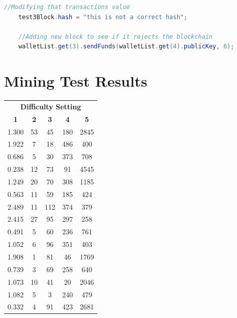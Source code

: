 \documentclass{l4proj}
\begin{document}
\begin{appendices}
\begin{lstlisting}[language=java, float=h
    , label=lst:testCode]
    //Modifying that transactions value
    test3Block.hash = "this is not a correct hash";

    //Adding new block to see if it rejects the blockchain
    walletList.get(3).sendFunds(walletList.get(4).publicKey, 6);
\end{lstlisting}

\section{Mining Test Results}
\begin{table}[!ht]
    \centering
    \begin{tabular}{ccccc}
    \hline
    \multicolumn{5}{c}{\textbf{Difficulty Setting}}                \\
    \textbf{1} & \textbf{2} & \textbf{3} & \textbf{4} & \textbf{5} \\ \hline
    1.300      & 53         & 45         & 180        & 2845       \\
    1.922      & 7          & 18         & 486        & 400        \\
    0.686      & 5          & 30         & 373        & 708        \\
    0.238      & 12         & 73         & 91         & 4545       \\
    1.249      & 20         & 70         & 308        & 1185       \\
    0.563      & 11         & 59         & 185        & 424        \\
    2.489      & 11         & 112        & 374        & 379        \\
    2.415      & 27         & 95         & 297        & 258        \\
    0.491      & 5          & 60         & 236        & 761        \\
    1.052      & 6          & 96         & 351        & 403        \\
    1.908      & 1          & 81         & 46         & 1769       \\
    0.739      & 3          & 69         & 258        & 640        \\
    1.073      & 10         & 41         & 20         & 2046       \\
    1.082      & 5          & 3          & 240        & 479        \\
    0.332      & 4          & 91         & 423        & 2681       \\

\end{tabular}
\end{table}
\end{appendices}
\end{document}
